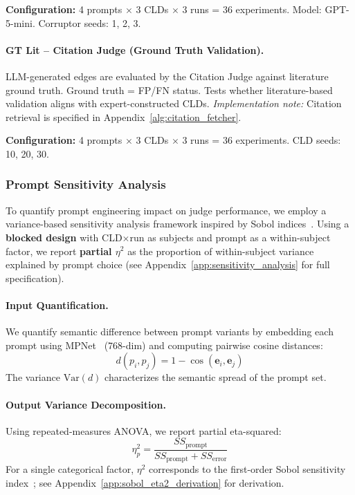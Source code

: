 \textbf{Configuration:} 4 prompts $\times$ 3 CLDs $\times$ 3 runs = 36 experiments. Model: GPT-5-mini. Corruptor seeds: 1, 2, 3.

\paragraph{GT Lit -- Citation Judge (Ground Truth Validation).}
LLM-generated edges are evaluated by the Citation Judge against literature ground truth. Ground truth = FP/FN status. Tests whether literature-based validation aligns with expert-constructed CLDs.
\textit{Implementation note:} Citation retrieval is specified in Appendix~\ref{alg:citation_fetcher}.

\textbf{Configuration:} 4 prompts $\times$ 3 CLDs $\times$ 3 runs = 36 experiments. CLD seeds: 10, 20, 30.

\subsubsection{Prompt Sensitivity Analysis}
\label{sec:rq1a_sensitivity}

To quantify prompt engineering impact on judge performance, we employ a variance-based sensitivity analysis framework inspired by Sobol indices~\cite{sobol1993sensitivity}. Using a \textbf{blocked design} with CLD$\times$run as subjects and prompt as a within-subject factor, we report \textbf{partial $\eta^2$} as the proportion of within-subject variance explained by prompt choice (see Appendix~\ref{app:sensitivity_analysis} for full specification).

\paragraph{Input Quantification.}
We quantify semantic difference between prompt variants by embedding each prompt using MPNet~\cite{song2020mpnet} (768-dim) and computing pairwise cosine distances:
\begin{equation}
d(p_i, p_j) = 1 - \cos(\mathbf{e}_i, \mathbf{e}_j)
\end{equation}
The variance $\text{Var}(d)$ characterizes the semantic spread of the prompt set.

\paragraph{Output Variance Decomposition.}
Using repeated-measures ANOVA, we report partial eta-squared:
\begin{equation}
\eta^2_p = \frac{SS_{\text{prompt}}}{SS_{\text{prompt}} + SS_{\text{error}}}
\end{equation}
For a single categorical factor, $\eta^2$ corresponds to the first-order Sobol sensitivity index~\cite{saltelli2010variance}; see Appendix~\ref{app:sobol_eta2_derivation} for derivation.

